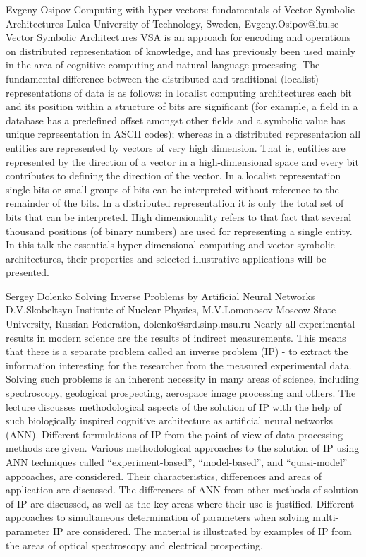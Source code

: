 \documentclass[10pt,fleqn,openany]{book} %
\begin{document}
\begin{enumerate}
	\paperabstract
		{Evgeny Osipov}
		{Computing with hyper-vectors: fundamentals of Vector Symbolic Architectures}
		{Lulea University of Technology, Sweden, Evgeny.Osipov@ltu.se}
		{
			Vector Symbolic Architectures VSA is an approach for encoding and operations on distributed representation of knowledge, and has previously been used mainly in the area of cognitive computing and natural language processing. The fundamental difference between the distributed and traditional (localist) representations of data is as follows: in localist computing architectures each bit and its position within a structure of bits are significant (for example, a field in a database has a predefined offset amongst other fields and a symbolic value has unique representation in ASCII codes); whereas in a distributed representation all entities are represented by vectors of very high dimension. That is, entities are represented by the direction of a vector in a high-dimensional space and every bit contributes to defining the direction of the vector. In a localist representation single bits or small groups of bits can be interpreted without reference to the remainder of the bits. In a distributed representation it is only the total set of bits that can be interpreted. High dimensionality refers to that fact that several thousand positions (of binary numbers) are used for representing a single entity. In this talk the essentials hyper-dimensional computing and vector symbolic architectures, their properties and selected illustrative applications will be presented.}
		
	\paperabstract
		{Sergey Dolenko}
		{Solving Inverse Problems by Artificial Neural Networks}
		{D.V.Skobeltsyn Institute of Nuclear Physics, M.V.Lomonosov Moscow State University, Russian Federation, dolenko@srd.sinp.msu.ru}
		{
			Nearly all experimental results in modern science are the results of indirect measurements. This means that there is a separate problem called an inverse problem (IP) - to extract the information interesting for the researcher from the measured experimental data. Solving such problems is an inherent necessity in many areas of science, including spectroscopy, geological prospecting, aerospace image processing and others. The lecture discusses methodological aspects of the solution of IP with the help of such biologically inspired cognitive architecture as artificial neural networks (ANN). Different formulations of IP from the point of view of data processing methods are given. Various methodological approaches to the solution of IP using ANN techniques called “experiment-based”, “model-based”, and “quasi-model” approaches, are considered. Their characteristics, differences and areas of application are discussed. The differences of ANN from other methods of solution of IP are discussed, as well as the key areas where their use is justified. Different approaches to simultaneous determination of parameters when solving multi-parameter IP are considered. The material is illustrated by examples of IP from the areas of optical spectroscopy and electrical prospecting.}
		

\end{enumerate}
\end{document}
